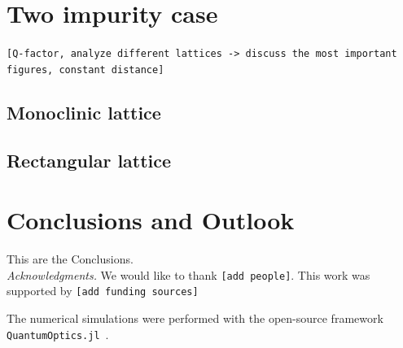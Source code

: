 \documentclass[aps,pra,superscriptaddress,twocolumn]{revtex4-1}
\newcommand{\commentSO}[1]{\texttt{\color{orange}[#1]}}
\begin{document}
\section{Two impurity case}
\commentSO{Q-factor, analyze different lattices -> discuss the most important figures, constant distance}

\subsection{Monoclinic lattice}


\subsection{Rectangular lattice}


\section{Conclusions and Outlook}\label{sec:conclusion}

This are the Conclusions.\\[2ex]

\emph{Acknowledgments.} We would like to thank \commentSO{add people}. This work was supported by \commentSO{add funding sources}

The numerical simulations were performed with the open-source framework \texttt{QuantumOptics.jl}~\cite{kramer_quantumopticsjl_2018}.




\end{document}
